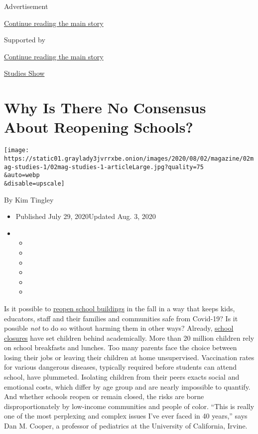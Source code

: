 Advertisement

\protect\hyperlink{after-top}{Continue reading the main story}

Supported by

\protect\hyperlink{after-sponsor}{Continue reading the main story}

\href{/column/studies-show}{Studies Show}

\hypertarget{why-is-there-no-consensus-about-reopening-schools}{%
\section{Why Is There No Consensus About Reopening
Schools?}\label{why-is-there-no-consensus-about-reopening-schools}}

\texttt{[image: https://static01.graylady3jvrrxbe.onion/images/2020/08/02/magazine/02mag-studies-1/02mag-studies-1-articleLarge.jpg?quality=75\\\&auto=webp\\\&disable=upscale]}

By Kim Tingley

\begin{itemize}
\item
  Published July 29, 2020Updated Aug. 3, 2020
\item
  \begin{itemize}
  \item
  \item
  \item
  \item
  \item
  \item
  \end{itemize}
\end{itemize}

Is it possible to
\href{https://www.nytimes3xbfgragh.onion/2020/08/03/us/school-closing-coronavirus.html}{reopen
school buildings} in the fall in a way that keeps kids, educators, staff
and their families and communities safe from Covid-19? Is it possible
\emph{not} to do so without harming them in other ways? Already,
\href{https://www.nytimes3xbfgragh.onion/2020/07/29/health/covid-school-reopening.html}{school
closures} have set children behind academically. More than 20 million
children rely on school breakfasts and lunches. Too many parents face
the choice between losing their jobs or leaving their children at home
unsupervised. Vaccination rates for various dangerous diseases,
typically required before students can attend school, have plummeted.
Isolating children from their peers exacts social and emotional costs,
which differ by age group and are nearly impossible to quantify. And
whether schools reopen or remain closed, the risks are borne
disproportionately by low-income communities and people of color. ``This
is really one of the most perplexing and complex issues I've ever faced
in 40 years,'' says Dan M. Cooper, a professor of pediatrics at the
University of California, Irvine.

